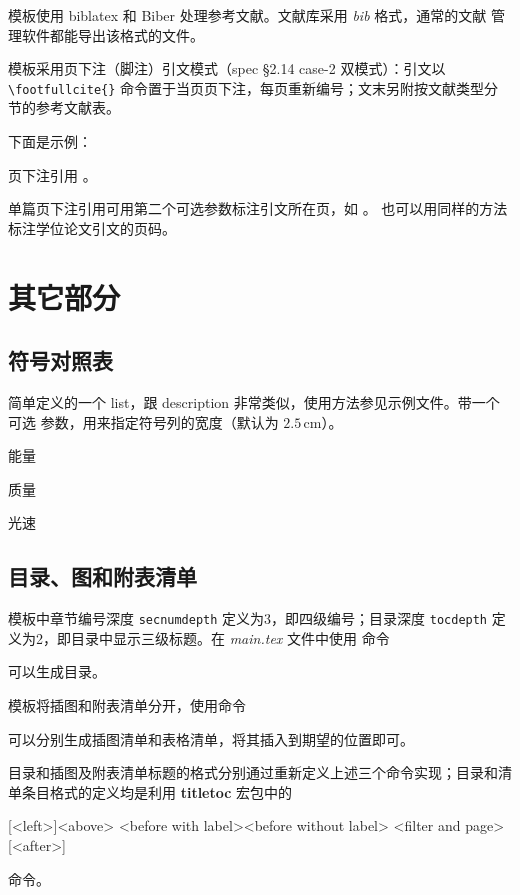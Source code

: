 模板使用 biblatex 和 Biber 处理参考文献。文献库采用 \emph{bib} 格式，通常的文献
管理软件都能导出该格式的文件。

模板采用页下注（脚注）引文模式（spec §2.14 case-2 双模式）：引文以 \verb|\footfullcite{}|
命令置于当页页下注，每页重新编号；文末另附按文献类型分节的参考文献表。

下面是示例：

页下注引用 。

单篇页下注引用可用第二个可选参数标注引文所在页，如 。
也可以用同样的方法标注学位论文引文的页码。

\section{其它部分}
\label{sec:otherparts}

\subsection*{符号对照表}

简单定义的一个 list，跟 description 非常类似，使用方法参见示例文件。带一个可选
参数，用来指定符号列的宽度（默认为 $2.5\,\mathrm{cm}$）。
\begin{latex}
\begin{denotation}[1.5cm]
  \item[E] 能量
  \item[m] 质量
  \item[c] 光速
\end{denotation}
\end{latex}

\subsection*{目录、图和附表清单}

模板中章节编号深度 \texttt{secnumdepth} 定义为3，即四级编号；目录深度
\texttt{tocdepth} 定义为2，即目录中显示三级标题。在 \emph{main.tex} 文件中使用
命令 
\begin{latex}
\tableofcontents
\end{latex}
可以生成目录。

模板将插图和附表清单分开，使用命令 
\begin{latex}
\listoffigures
\listoftables
\end{latex}
可以分别生成插图清单和表格清单，将其插入到期望的位置即可。

目录和插图及附表清单标题的格式分别通过重新定义上述三个命令实现；目录和清单条目格式的定义均是利用 \textbf{titletoc} 宏包中的
\begin{latex}
[<left>]{<above>}
              {<before with label>}{<before without label>}
              {<filter and page>}[<after>]
\end{latex}
命令。

